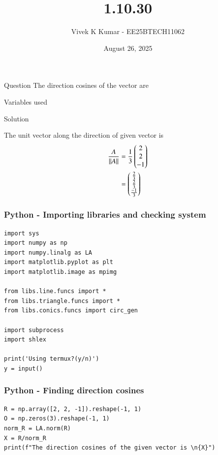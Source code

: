 \documentclass{beamer}
\title 
{1.10.30}
\date{August 26, 2025}
\author 
{Vivek K Kumar - EE25BTECH11062}
\begin{document}
\frame{\titlepage}
\begin{frame}{Question}
The direction cosines of the vector  are \underline{\hspace{0.1\columnwidth}}
\end{frame}



\begin{frame}{Variables used}
\begin{table}[H]    
  \centering
  
  \caption{Variables Used}
  \label{tab:1.6.12}
\end{table}

\end{frame}

\begin{frame}{Solution}

The unit vector along the direction of given vector is\\
\begin{align}
\frac{A}{\left\lVert A\right\rVert} &= \frac{1}{3}\begin{pmatrix}2 \\ 2 \\ -1\end{pmatrix} \\
 &=\begin{pmatrix}\frac{2}{3} \\ \frac{2}{3} \\ \frac{-1}{3}\end{pmatrix}
\end{align}

\end{frame}

\begin{frame}[fragile]
    \frametitle{Python - Importing libraries and checking system}
    \begin{lstlisting}
import sys
import numpy as np
import numpy.linalg as LA
import matplotlib.pyplot as plt
import matplotlib.image as mpimg

from libs.line.funcs import *
from libs.triangle.funcs import *
from libs.conics.funcs import circ_gen

import subprocess
import shlex

print('Using termux?(y/n)')
y = input()
\end{lstlisting}
\end{frame}

\begin{frame}[fragile]
    \frametitle{Python - Finding direction cosines}
    \begin{lstlisting}
R = np.array([2, 2, -1]).reshape(-1, 1)
O = np.zeros(3).reshape(-1, 1)
norm_R = LA.norm(R)
X = R/norm_R
print(f"The direction cosines of the given vector is \n{X}")
\end{lstlisting}
\end{frame}
\end{document}
